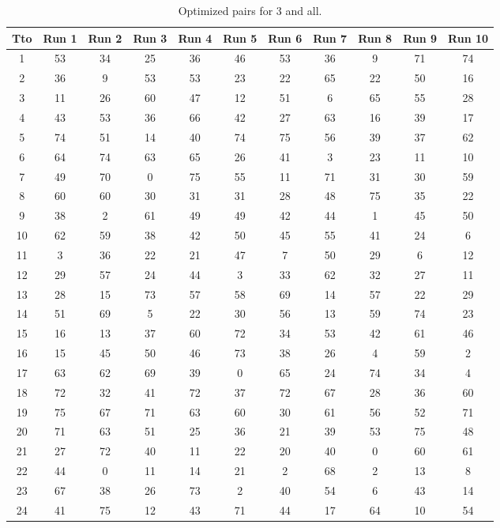 \begin{table}
  \centering
  \scriptsize
  \caption{Optimized pairs for 3 and all.}
  \label{tab_pairs}
\begin{tabular}{c c c c c c c c c c c }
\hline
Tto & Run 1 & Run 2 & Run 3 & Run 4 & Run 5 & Run 6 & Run 7 & Run 8 & Run 9 & Run 10 \\
\hline
1 & 53 & 34 & 25 & 36 & 46 & 53 & 36 & 9 & 71 & 74 \\
2 & 36 & 9 & 53 & 53 & 23 & 22 & 65 & 22 & 50 & 16 \\
3 & 11 & 26 & 60 & 47 & 12 & 51 & 6 & 65 & 55 & 28 \\
4 & 43 & 53 & 36 & 66 & 42 & 27 & 63 & 16 & 39 & 17 \\
5 & 74 & 51 & 14 & 40 & 74 & 75 & 56 & 39 & 37 & 62 \\
6 & 64 & 74 & 63 & 65 & 26 & 41 & 3 & 23 & 11 & 10 \\
7 & 49 & 70 & 0 & 75 & 55 & 11 & 71 & 31 & 30 & 59 \\
8 & 60 & 60 & 30 & 31 & 31 & 28 & 48 & 75 & 35 & 22 \\
9 & 38 & 2 & 61 & 49 & 49 & 42 & 44 & 1 & 45 & 50 \\
10 & 62 & 59 & 38 & 42 & 50 & 45 & 55 & 41 & 24 & 6 \\
11 & 3 & 36 & 22 & 21 & 47 & 7 & 50 & 29 & 6 & 12 \\
12 & 29 & 57 & 24 & 44 & 3 & 33 & 62 & 32 & 27 & 11 \\
13 & 28 & 15 & 73 & 57 & 58 & 69 & 14 & 57 & 22 & 29 \\
14 & 51 & 69 & 5 & 22 & 30 & 56 & 13 & 59 & 74 & 23 \\
15 & 16 & 13 & 37 & 60 & 72 & 34 & 53 & 42 & 61 & 46 \\
16 & 15 & 45 & 50 & 46 & 73 & 38 & 26 & 4 & 59 & 2 \\
17 & 63 & 62 & 69 & 39 & 0 & 65 & 24 & 74 & 34 & 4 \\
18 & 72 & 32 & 41 & 72 & 37 & 72 & 67 & 28 & 36 & 60 \\
19 & 75 & 67 & 71 & 63 & 60 & 30 & 61 & 56 & 52 & 71 \\
20 & 71 & 63 & 51 & 25 & 36 & 21 & 39 & 53 & 75 & 48 \\
21 & 27 & 72 & 40 & 11 & 22 & 20 & 40 & 0 & 60 & 61 \\
22 & 44 & 0 & 11 & 14 & 21 & 2 & 68 & 2 & 13 & 8 \\
23 & 67 & 38 & 26 & 73 & 2 & 40 & 54 & 6 & 43 & 14 \\
24 & 41 & 75 & 12 & 43 & 71 & 44 & 17 & 64 & 10 & 54 \\

\end{tabular}
\end{table}
